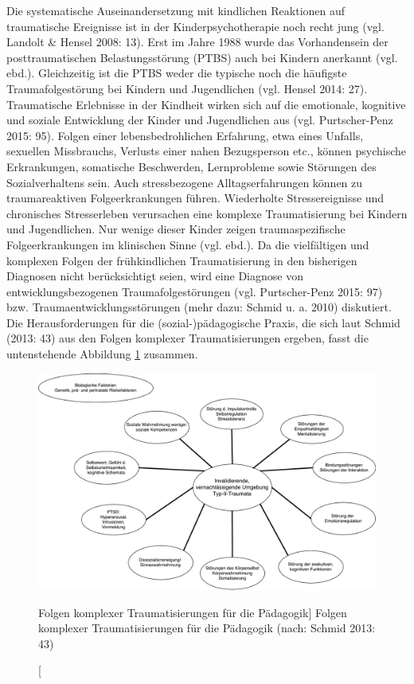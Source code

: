 Die systematische Auseinandersetzung mit kindlichen Reaktionen auf traumatische Ereignisse ist in der Kinderpsychotherapie noch recht jung (vgl. Landolt \& Hensel 2008: 13). Erst im Jahre 1988 wurde das Vorhandensein der posttraumatischen Belastungsstörung (PTBS) auch bei Kindern anerkannt (vgl. ebd.). Gleichzeitig ist die PTBS weder die typische noch die häufigste Traumafolgestörung bei Kindern und Jugendlichen (vgl. Hensel 2014: 27). Traumatische Erlebnisse in der Kindheit wirken sich auf die emotionale, kognitive und soziale Entwicklung der Kinder und Jugendlichen aus (vgl. Purtscher-Penz 2015: 95). Folgen einer lebensbedrohlichen Erfahrung, etwa eines Unfalls, sexuellen Missbrauchs, Verlusts einer nahen Bezugsperson etc., können psychische Erkrankungen, somatische Beschwerden, Lernprobleme sowie Störungen des Sozialverhaltens sein. Auch stressbezogene Alltagserfahrungen können zu traumareaktiven Folgeerkrankungen führen. Wiederholte Stressereignisse und chronisches Stresserleben verursachen eine komplexe Traumatisierung bei Kindern und Jugendlichen. Nur wenige dieser Kinder zeigen traumaspezifische Folgeerkrankungen im klinischen Sinne (vgl. ebd.). Da die vielfältigen und komplexen Folgen der frühkindlichen Traumatisierung in den bisherigen Diagnosen nicht berücksichtigt seien, wird eine Diagnose von entwicklungsbezogenen Traumafolgestörungen (vgl. Purtscher-Penz 2015: 97) bzw. Traumaentwicklungsstörungen (mehr dazu: Schmid u. a. 2010) diskutiert. Die Herausforderungen für die (sozial-)pädagogische Praxis, die sich laut Schmid (2013: 43) aus den Folgen komplexer Traumatisierungen ergeben, fasst die untenstehende Abbildung \ref{fig:folgen} zusammen.

\begin{figure}[h]
  \centering
  \includegraphics[scale=0.45]{abbildung4}
  \caption
      [Folgen komplexer Traumatisierungen für die Pädagogik]
      {Folgen komplexer Traumatisierungen für die Pädagogik (nach: Schmid 2013: 43)}
  \label{fig:folgen}
\end{figure}

